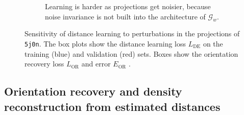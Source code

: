 \begin{figure}[ht!]
\begin{subfigure}[t]{0.47\linewidth}
{            Learning is harder as projections get noisier, because noise invariance is not built into the architecture of $\mathcal{G}_w$.
        }\label{fig:results:distance-estimation:noise}
    \end{subfigure}
    \caption{%
        Sensitivity of distance learning to perturbations in the projections of \texttt{5j0n}.
        The box plots show the distance learning loss $L_\text{DE}$  on the training (blue) and validation (red) sets.
        Boxes show the orientation recovery loss $L_\text{OR}$  and error $E_\text{OR}$ .
    }
\end{figure}


\subsection{Orientation recovery and density reconstruction from estimated distances}\label{sec:results:orientation-recovery:reconstruction}

